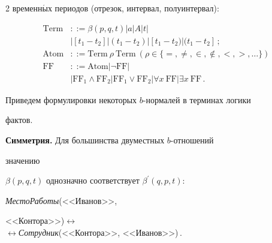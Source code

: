 \begin{multicols}{2}
временн$\acute{\mbox{ы}}$х периодов (отрезок, интервал, полуинтервал):


  \begin{align*}


\mathrm{Term}&::= \beta (p, q, t) \vert a \vert  A\vert t \vert \\


& \vert [t_1 - t_2] \vert (t_1 - t_2) \vert 


[t_1 - t_2) \vert (t_1 - t_2]\,;\\


 \mathrm{Atom}&::= \mathrm{Term}\ \rho\  \mathrm{Term} \ \left(\rho\in \{=, \not=, \in, \not\in, 


 <,  >,\ldots\}\right)\\


\mathrm{FF}&::=\mathrm{Atom} \vert \neg \mathrm{FF} \vert\\


  &\vert \mathrm{FF}_1 \wedge 


  \mathrm{FF}_2\vert  \mathrm{FF}_1 \vee \mathrm{FF}_2 \vert \forall x\ 


\mathrm{FF} \vert  \exists x\ \mathrm{FF}\,.




  \end{align*}


  


  Приведем формулировки некоторых $b$-нор\-ма\-лей в терминах логики 


фактов.


  \smallskip


  


  \textbf{Симметрия.} Для большинства двуместных $b$-от\-но\-ше\-ний 


значению  


$\beta (p, q, t)$ однозначно соответствует $\beta^\prime (q, p, t)$: 





\smallskip


   


\textit{МестоРаботы}(<<Иванов>>, 


<<Контора>>)\;$\leftrightarrow$\\[-9pt]





\hspace*{10mm}$\leftrightarrow$\;\textit{Сотрудник}(<<Контора>>,  <<Иванов>>)\,.



\end{multicols}
